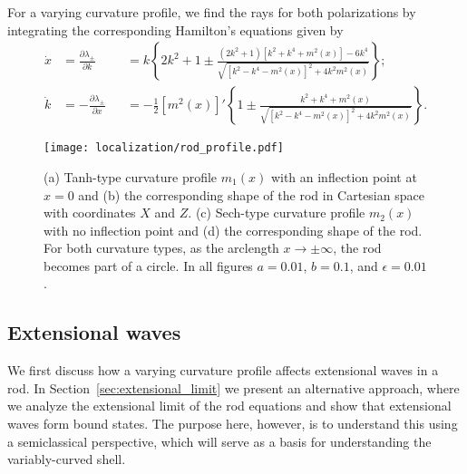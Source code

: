 For a varying curvature profile, we find the rays for both polarizations by integrating the corresponding Hamilton's equations given by
%
\begin{equation}
  \begin{alignedat}{2}
      \dot{x} &= \frac{\partial \lambda_{\pm}}{\partial k} &&= k\left\{2k^{2} + 1 \pm \frac{(2k^{2} + 1)\left[k^{2} + k^{4} + m^{2}(x)\right] - 6k^{4}}{\sqrt{\left[k^{2}-k^{4}-m^{2}(x)\right]^{2} + 4k^{2}m^{2}(x)}}\right\};\\
      \dot{k} &= -\frac{\partial \lambda_{\pm}}{\partial x} &&= -\frac{1}{2}\left[m^{2}(x)\right]'\left\{1 \pm \frac{k^{2} + k^{4} + m^{2}(x)}{\sqrt{\left[k^{2}-k^{4}-m^{2}(x)\right]^{2} + 4k^{2}m^{2}(x)}}\right\}.
  \end{alignedat}
  \label{eq:rod_hamiltonian}
\end{equation}
%
\begin{figure}
  \begin{center}
    \texttt{[image: localization/rod\_profile.pdf]}
  \end{center}
  \caption{%
    (a) Tanh-type curvature profile $m_{1}(x)$ with an inflection point at $x = 0$ and (b) the corresponding shape of the rod in Cartesian space with coordinates $X$ and $Z$.
    (c) Sech-type curvature profile $m_{2}(x)$ with no inflection point and (d) the corresponding shape of the rod.
    For both curvature types, as the arclength $x \to \pm\infty$, the rod becomes part of a circle.
    In all figures $a = 0.01$, $b = 0.1$, and $\epsilon = 0.01$.
  }
  \label{fig:rod_profile}
\end{figure}

\subsection{Extensional waves}
\label{sec:extensional}

We first discuss how a varying curvature profile affects extensional waves in a rod.
In Section~\ref{sec:extensional_limit} we present an alternative approach, where we analyze the extensional limit of the rod equations and show that extensional waves form bound states.
The purpose here, however, is to understand this using a semiclassical perspective, which will serve as a basis for understanding the variably-curved shell.

